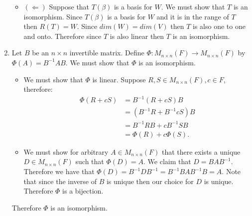 \documentclass[12pt, letterpaper]{article}
\begin{document}
\begin{enumerate}
\begin{itemize}
		\item $(\Leftarrow)$ Suppose that $T(\beta)$ is a basis for $W$.  We must show that $T$ is an isomorphism.  Since $T(\beta)$ is a basis for $W$ and it is in the range of $T$ then $R(T) = W$.  Since $dim(W) = dim(V)$ then $T$ is also one to one and onto.  Therefore since $T$ is also linear then $T$ is an isomorphism. 
	\end{itemize} 
	\newpage 
	\item Let $B$ be an $n \times n$ invertible matrix.   Define $\Phi : M_{n \times n}(F) \to M_{n \times n}(F)$ by $\Phi(A) = B^{-1} A B$.  We must show that $\Phi$ is an isomorphism. 
	\begin{itemize} 
		\item We must show that $\Phi$ is linear.  Suppose $R,S \in M_{n \times n}(F), c \in F$, therefore: 
		\begin{align*} 
			\Phi(R + cS) &= B^{-1}(R + cS)B\\ 
			&= (B^{-1}R+ B^{-1}cS)B\\ 
			&= B^{-1}RB + c B^{-1}SB\\ 
			&= \Phi(R) + c\Phi(S). 
		\end{align*} 
		\item We must show for arbitrary $A \in  M_{n \times n}(F)$ that there exists a unique $D \in  M_{n \times n}(F)$ such that $\Phi(D) = A$.  We claim that $D = BAB^{-1}$.  Therefore we have that $\Phi(D) = B^{-1} D B^{-1}= B^{-1} BAB^{-1} B = A $. Note that since the inverse of $B$ is unique then our choice for $D$ is unique.  Therefore $\Phi$ is a bijection.
	\end{itemize}
	Therefore $\Phi$ is an isomorphism.  
\end{enumerate}
\end{document}
